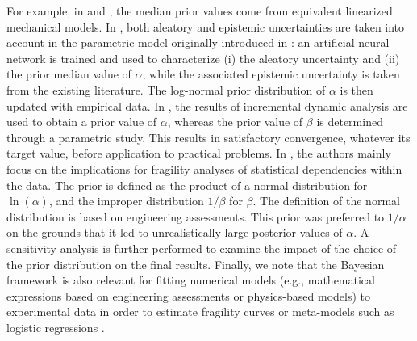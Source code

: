 %
For example, in \cite{tadinada_structural_2017} and \cite{kwag_computationally_2018}, the median prior values come from equivalent linearized mechanical models. In \cite{wang_bayesian_2018}, both aleatory and epistemic uncertainties are taken into account in the parametric model originally introduced in \cite{kennedy_probabilistic_1980}: an artificial neural network is trained and used to characterize (i) the aleatory uncertainty and (ii) the prior median value of $\alpha$, while the associated epistemic uncertainty is taken from the existing literature. The log-normal prior distribution of $\alpha$ is then updated with empirical data. 
In \cite{katayama_bayesian-estimation-based_2021}, the results of incremental dynamic analysis are used to obtain a prior value of $\alpha$, whereas the prior value of $\beta$ is determined through a parametric study. This results in satisfactory convergence, whatever its target value, before application to practical problems.
In \cite{straub_improved_2008}, the authors mainly focus on the implications for fragility analyses of statistical dependencies within the data. The prior is defined as the product of a normal distribution for $\ln(\alpha)$, and the improper distribution $1/\beta$ for $\beta$. The definition of the normal distribution is based on engineering assessments. This prior was preferred to $1/\alpha$ on the grounds that it led to unrealistically large posterior values of $\alpha$. A sensitivity analysis is further performed to examine the impact of the choice of the prior distribution on the final results.
Finally, we note that the Bayesian framework is also relevant for fitting numerical models (e.g., mathematical expressions based on engineering assessments or physics-based models) to experimental data in order to estimate fragility curves \citep{gardoni_probabilistic_2002,tabandeh_physics-based_2020} or meta-models such as logistic regressions \citep{koutsourelakis_assessing_2010,jeon_parameterized_2019}.









